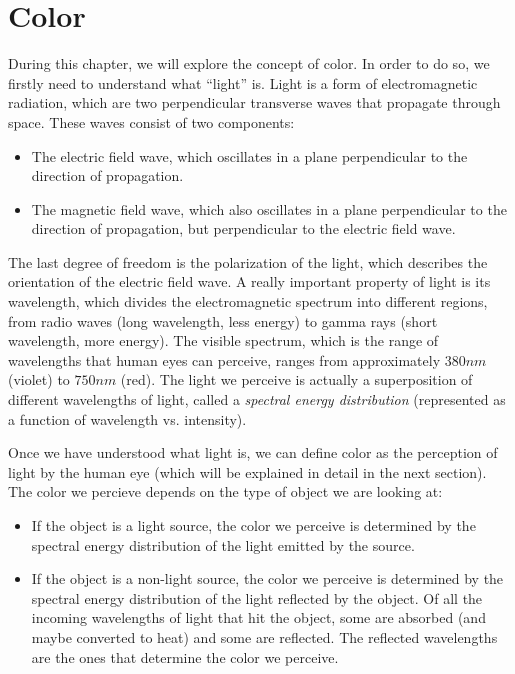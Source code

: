 \chapter{Color}

During this chapter, we will explore the concept of color. In order to do so, we firstly need to understand what ``light'' is. Light is a form of electromagnetic radiation, which are two perpendicular transverse waves that propagate through space. These waves consist of two components:
\begin{itemize}
    \item The electric field wave, which oscillates in a plane perpendicular to the direction of propagation.
    \item The magnetic field wave, which also oscillates in a plane perpendicular to the direction of propagation, but perpendicular to the electric field wave.
\end{itemize}
The last degree of freedom is the polarization of the light, which describes the orientation of the electric field wave. A really important property of light is its wavelength, which divides the electromagnetic spectrum into different regions, from radio waves (long wavelength, less energy) to gamma rays (short wavelength, more energy). The visible spectrum, which is the range of wavelengths that human eyes can perceive, ranges from approximately $\unit{380}{nm}$ (violet) to $\unit{750}{nm}$ (red). The light we perceive is actually a superposition of different wavelengths of light, called a \emph{spectral energy distribution} (represented as a function of wavelength vs. intensity).

Once we have understood what light is, we can define color as the perception of light by the human eye (which will be explained in detail in the next section). The color we percieve depends on the type of object we are looking at:
\begin{itemize}
    \item If the object is a light source, the color we perceive is determined by the spectral energy distribution of the light emitted by the source.
    \item If the object is a non-light source, the color we perceive is determined by the spectral energy distribution of the light reflected by the object. Of all the incoming wavelengths of light that hit the object, some are absorbed (and maybe converted to heat) and some are reflected. The reflected wavelengths are the ones that determine the color we perceive.
\end{itemize}

